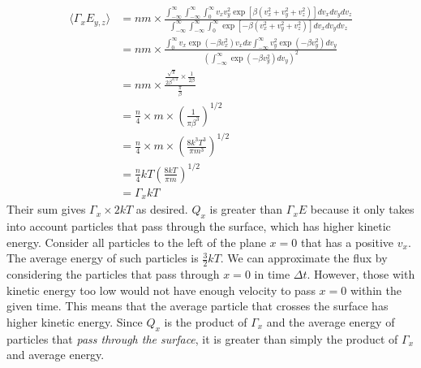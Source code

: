 \documentclass[answers]{exam}
\begin{document}
\begin{questions}
\begin{solution}
    \begin{align*}
        \langle \Gamma_xE_{y,z}\rangle &= nm \times \frac{\int_{-\infty}^\infty \int_{-\infty}^\infty \int_0^\infty v_xv_y^2\exp\left[\beta\left(v_x^2+v_y^2+v_z^2\right)\right]dv_xdv_ydv_z}{\int_{-\infty}^\infty \int_{-\infty}^\infty \int_0^\infty \exp\left[-\beta\left(v_x^2+v_y^2+v_z^2\right)\right]dv_xdv_ydv_z} \\
                                &= nm \times \frac{\int_0^\infty v_x\exp\left(-\beta v_x^2\right)v_xdx \int_{-\infty}^\infty v_y^2\exp\left(-\beta v_y^2\right) dv_y}{\left(\int_{-\infty}^\infty \exp\left(-\beta v_y^2\right)dv_y\right)^2} \\
                                &= nm \times \frac{\frac{\sqrt{\pi}}{2\beta^{3/2}} \times \frac{1}{2\beta}}{\frac{\pi}{\beta}} \\
                                &= \frac{n}{4} \times m \times \left(\frac{1}{\pi\beta^3}\right)^{1/2} \\
                                &= \frac{n}{4} \times m \times \left(\frac{8k^3T^3}{\pi m^3}\right)^{1/2} \\
                                &= \frac{n}{4} kT \left(\frac{8kT}{\pi m}\right)^{1/2} \\
                                &= \Gamma_x kT
    \end{align*}
    Their sum gives $\Gamma_x \times 2kT$ as desired. $Q_x$ is greater than $\Gamma_xE$ because it only takes into account particles that pass through the surface, which has higher kinetic energy. Consider all particles to the left of the plane $x=0$ that has a positive $v_x$. The average energy of such particles is $\frac{3}{2}kT$. We can approximate the flux by considering the particles that pass through $x=0$ in time $\Delta t$. However, those with kinetic energy too low would not have enough velocity to pass $x=0$ within the given time. This means that the average particle that crosses the surface has higher kinetic energy. Since $Q_x$ is the product of $\Gamma_x$ and the average energy of particles that \textit{pass through the surface}, it is greater than simply the product of $\Gamma_x$ and average energy.
\end{solution}



\end{questions}
\end{document}

